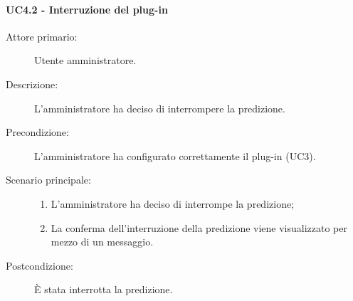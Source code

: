 \paragraph{UC4.2 - Interruzione del plug-in}
\label{sssec:uc4.2}
\begin{description}
  \item[Attore primario:] Utente amministratore.
  \item[Descrizione:] L'amministratore ha deciso di interrompere la predizione.
  \item[Precondizione:] L'amministratore ha configurato correttamente il plug-in (UC3).
  \item[Scenario principale:]
  \begin{enumerate}
    \item L'amministratore ha deciso di interrompe la predizione;
    \item La conferma dell'interruzione della predizione viene visualizzato per mezzo di un messaggio.
  \end{enumerate}
  \item[Postcondizione:] È stata interrotta la predizione.
\end{description}
